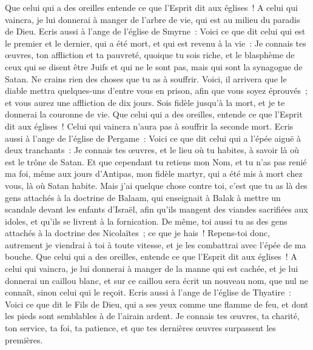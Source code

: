 \begin{multicols}{2}
Que celui qui a des oreilles entende ce que l'Esprit dit aux églises~! A celui qui vaincra, je lui donnerai à manger de l'arbre de vie, qui est au milieu du paradis de Dieu.
Ecris aussi à l'ange de l'église de Smyrne~: Voici ce que dit celui qui est le premier et le dernier, qui a été mort, et qui est revenu à la vie~:
Je connais tes œuvres, ton affliction et ta pauvreté, quoique tu sois riche, et le blasphème de ceux qui se disent être Juifs et qui ne le sont pas, mais qui sont la synagogue de Satan.
Ne crains rien des choses que tu as à souffrir. Voici, il arrivera que le diable mettra quelques-uns d'entre vous en prison, afin que vous soyez éprouvés~; et vous aurez une affliction de dix jours. Sois fidèle jusqu'à la mort, et je te donnerai la couronne de vie.
Que celui qui a des oreilles, entende ce que l'Esprit dit aux églises~! Celui qui vaincra n'aura pas à souffrir la seconde mort.
Ecris aussi à l'ange de l'église de Pergame~: Voici ce que dit celui qui a l'épée aiguë à deux tranchants~: 
Je connais tes œuvres, et le lieu où tu habites, à savoir là où est le trône de Satan. Et que cependant tu retiens mon Nom, et tu n'as pas renié ma foi, même aux jours d'Antipas, mon fidèle martyr, qui a été mis à mort chez vous, là où Satan habite.
Mais j'ai quelque chose contre toi, c'est que tu as là des gens attachés à la doctrine de Balaam, qui enseignait à Balak à mettre un scandale devant les enfants d'Israël, afin qu'ils mangent des viandes sacrifiées aux idoles, et qu'ils se livrent à la fornication.
De même, toi aussi tu as des gens attachés à la doctrine des Nicolaïtes~; ce que je hais~!
Repens-toi donc, autrement je viendrai à toi à toute vitesse, et je les combattrai avec l'épée de ma bouche.
Que celui qui a des oreilles, entende ce que l'Esprit dit aux églises~! A celui qui vaincra, je lui donnerai à manger de la manne qui est cachée, et je lui donnerai un caillou blanc, et sur ce caillou sera écrit un nouveau nom, que nul ne connaît, sinon celui qui le reçoit.
Ecris aussi à l'ange de l'église de Thyatire~: Voici ce que dit le Fils de Dieu, qui a ses yeux comme une flamme de feu, et dont les pieds sont semblables à de l'airain ardent.
Je connais tes œuvres, ta charité, ton service, ta foi, ta patience, et que tes dernières œuvres surpassent les premières.

\end{multicols}
